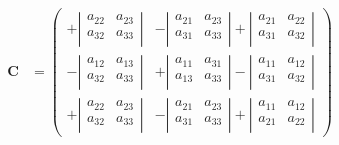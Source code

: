 \documentclass[10pt]{article}
\begin{document}
\begin{equation}
\begin{aligned} 
    \mathbf{C} &= 
    \begin{pmatrix} 
      +\left| \begin{array}{cc}
       a_{22} & a_{23} \\
       a_{32} & a_{33} \\
      \end{array} \right| 
      & 
      -\left| \begin{array}{cc}
       a_{21} & a_{23} \\
       a_{31} & a_{33} \\ 
      \end{array} \right| 
      +\left| \begin{array}{cc} 
       a_{21} & a_{22} \\
       a_{31} & a_{32} \\[5pt] 
     \end{array} \right| \\
     -\left| \begin{array}{cc}
       a_{12} & a_{13} \\[5pt]
       a_{32} & a_{33} \\
      \end{array} \right| 
      & 
      +\left| \begin{array}{cc}
       a_{11} & a_{31} \\
       a_{13} & a_{33} \\ 
      \end{array} \right| 
      -\left| \begin{array}{cc} 
       a_{11} & a_{12} \\
       a_{31} & a_{32} \\ 
     \end{array} \right| \\
     +\left| \begin{array}{cc}
       a_{22} & a_{23} \\[5pt]
       a_{32} & a_{33} \\
      \end{array} \right| 
      & 
      -\left| \begin{array}{cc}
       a_{21} & a_{23} \\[5pt]
       a_{31} & a_{33} \\ 
      \end{array} \right| 
      +\left| \begin{array}{cc} 
       a_{11} & a_{12} \\
       a_{21} & a_{22} \\
     \end{array} \right| 
    \end{pmatrix} \nonumber \\
\end{aligned} 
\end{equation}
\end{document}
